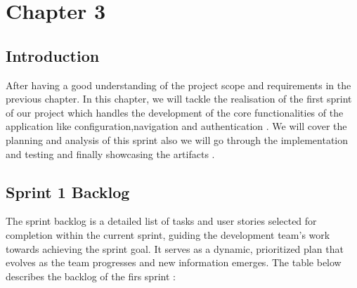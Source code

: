 
\chapter*{Chapter 3}




\setcounter{chapter}{3}
\setcounter{section}{0}
\setcounter{table}{0} 
\setcounter{figure}{0} 


\vspace{0.25cm}

\setcounter{tocdepth}{1}
\headrule


\localtableofcontents
\newpage






\section*{Introduction}
After having a good understanding of the project scope and requirements in the previous chapter.
In this chapter, we will tackle the realisation of  the first sprint of our project which handles the development of the core functionalities of the application like configuration,navigation and authentication . We will cover the planning and analysis of this sprint also we will go through the  implementation and testing and finally showcasing the artifacts .

\section{Sprint 1 Backlog}
The sprint backlog is a detailed list of tasks and user stories selected for completion within the current sprint, guiding the development team's work towards achieving the sprint goal. It serves as a dynamic, prioritized plan that evolves as the team progresses and new information emerges.
The table below describes the backlog of the firs sprint :



